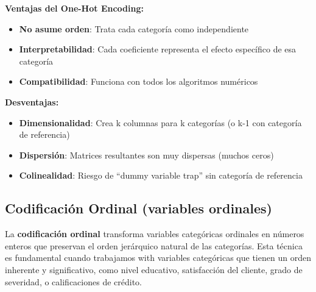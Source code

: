 \documentclass[
  letterpaper,
  DIV=11,
  numbers=noendperiod]{scrreprt}
\providecommand{\tightlist}{%
  \setlength{\itemsep}{0pt}\setlength{\parskip}{0pt}}
\begin{document}
\begin{tcolorbox}[enhanced jigsaw, leftrule=.75mm, breakable, colbacktitle=quarto-callout-note-color!10!white, bottomrule=.15mm, colframe=quarto-callout-note-color-frame, toprule=.15mm, colback=white, coltitle=black, bottomtitle=1mm, left=2mm, title=\textcolor{quarto-callout-note-color}{\faInfo}\hspace{0.5em}{Ventajas y desventajas}, opacityback=0, arc=.35mm, opacitybacktitle=0.6, toptitle=1mm, titlerule=0mm, rightrule=.15mm]

\textbf{Ventajas del One-Hot Encoding:}

\begin{itemize}
\tightlist
\item
  \textbf{No asume orden}: Trata cada categoría como independiente
\item
  \textbf{Interpretabilidad}: Cada coeficiente representa el efecto
  específico de esa categoría
\item
  \textbf{Compatibilidad}: Funciona con todos los algoritmos numéricos
\end{itemize}

\textbf{Desventajas:}

\begin{itemize}
\tightlist
\item
  \textbf{Dimensionalidad}: Crea k columnas para k categorías (o k-1 con
  categoría de referencia)
\item
  \textbf{Dispersión}: Matrices resultantes son muy dispersas (muchos
  ceros)
\item
  \textbf{Colinealidad}: Riesgo de ``dummy variable trap'' sin categoría
  de referencia
\end{itemize}

\end{tcolorbox}

\subsection{Codificación Ordinal (variables
ordinales)}\label{codificaciuxf3n-ordinal-variables-ordinales}

La \textbf{codificación ordinal} transforma variables categóricas
ordinales en números enteros que preservan el orden jerárquico natural
de las categorías. Esta técnica es fundamental cuando trabajamos with
variables categóricas que tienen un orden inherente y significativo,
como nivel educativo, satisfacción del cliente, grado de severidad, o
calificaciones de crédito.
\end{document}
